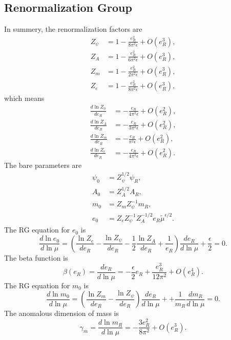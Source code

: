 \subsection{Renormalization Group}
In summery, the renormalization factors are
\begin{equation}
\begin{aligned}
	Z_\psi &= 1 -\frac{e_R^2}{8\pi^2\epsilon} + O(e_R^3), \\
	Z_A &= 1 - \frac{e_R^2}{6\pi^2 \epsilon} + O(e_R^3), \\
	Z_m &= 1 - \frac{e_R^2}{2\pi^2\epsilon} + O(e_R^3), \\
	Z_e &= 1 - \frac{e_R^2}{8\pi^2\epsilon} + O(e_R^3),
\end{aligned}
\end{equation}
which means
\begin{equation}
\begin{aligned}
	\frac{d\ln Z_\phi}{d e_R} &= -\frac{e_R}{4\pi^2 \epsilon} + O(e_R^2), \\
	\frac{d\ln Z_A}{d e_R} &= -\frac{e_R}{3\pi^2 \epsilon} + O(e_R^2), \\
	\frac{d\ln Z_m}{d e_R} &= -\frac{e_R}{\pi^2 \epsilon} + O(e_R^2), \\
	\frac{d\ln Z_e}{d e_R} &= -\frac{e_R}{4\pi^2 \epsilon} + O(e_R^2).
\end{aligned}
\end{equation}
The bare parameters are
\begin{equation}
\begin{aligned}
	\psi_0 &= Z_\psi^{1/2}\psi_R, \\
	A_0 &= Z_A^{1/2} A_R, \\
	m_0 &= Z_m Z_\psi^{-1} m_R, \\
	e_0 &= Z_e Z_\psi^{-1} Z_A^{-1/2} e_R \tilde{\mu}^{\epsilon/2}. 
\end{aligned}
\end{equation}
The RG equation for $e_0$ is
\begin{equation}
	\frac{d\ln e_0}{d\ln \mu}
	= \left(\frac{\ln Z_e}{d e_R} - \frac{\ln Z_\psi}{d e_R} - \frac{1}{2} \frac{\ln Z_A}{d e_R} + \frac{1}{e_R} \right)\frac{de_R}{d\ln \mu} + \frac{\epsilon}{2} = 0.
\end{equation}
The beta function is
\begin{equation}
	\beta(e_R) = \frac{de_R}{d\ln \mu} = -\frac{\epsilon}{2}e_R + \frac{e_R^3}{12\pi^2} + O(e_R^4).
\end{equation}
The RG equation for $m_0$ is
\begin{equation}
	\frac{d\ln m_0}{d\ln \mu}
	= \left(\frac{\ln Z_m}{d e_R} - \frac{\ln Z_\psi}{d e_R}\right)\frac{de_R}{d\ln \mu} + + \frac{1}{m_R}\frac{d m_R}{d\ln\mu} = 0.
\end{equation}
The anomalous dimension of mass is
\begin{equation}
	\gamma_m = \frac{d \ln m_R}{d\ln\mu} = -\frac{3e_R^2}{8\pi^2} + O(e_R^3).
\end{equation}



